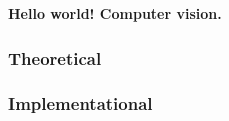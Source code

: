 \documentclass[../../../main]{subfiles}
\begin{document}
\textbf{Hello world! Computer vision.}

\subsubsection{Theoretical}

\newpage

\subsubsection{Implementational}

\newpage
\end{document}
